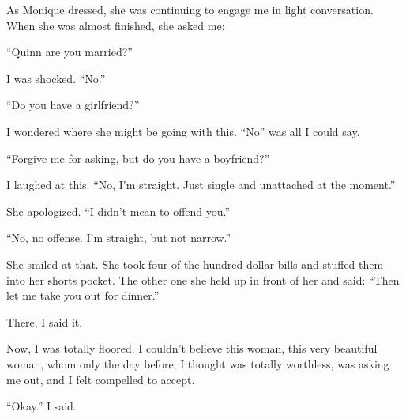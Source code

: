 As Monique dressed, she was continuing to engage me in light conversation. When she was
almost finished, she asked me:

``Quinn are you married?''

I was shocked. ``No.''

``Do you have a girlfriend?''

I wondered where she might be going with this. ``No'' was all I could say.

``Forgive me for asking, but do you have a boyfriend?''

I laughed at this. ``No, I'm straight. Just single and unattached at the moment.''

She apologized. ``I didn't mean to offend you.''

``No, no offense. I'm straight, but not narrow.''

She smiled at that. She took four of the hundred dollar bills and stuffed them into her
shorts pocket. The other one she held up in front of her and said: ``Then let me take you out
for
dinner.''

\begin{thought}
There, I said it.
\end{thought}

Now, I was totally floored. I couldn't believe this woman, this very beautiful woman, whom
only the day before, I thought was totally worthless, was asking me out, and I felt compelled to
accept.

``Okay.'' I said.
